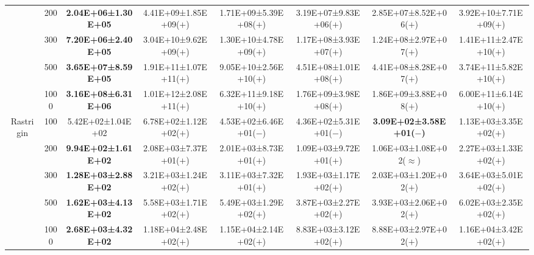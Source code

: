 \begin{tabular}{|cc|c|c|c|c|c|c|}
\multicolumn{1}{|c|}{}                            & 200       & \textbf{2.04E+06±1.30E+05} & 4.41E+09±1.85E+09($+$) & 1.71E+09±5.39E+08($+$)       & 3.19E+07±9.83E+06($+$)       & 2.85E+07±8.52E+06($+$)                & 3.92E+10±7.71E+09($+$) \\ \cline{2-8} 
\multicolumn{1}{|c|}{}                            & 300       & \textbf{7.20E+06±2.40E+05} & 3.04E+10±9.62E+09($+$) & 1.30E+10±4.78E+09($+$)       & 1.17E+08±3.93E+07($+$)       & 1.24E+08±2.97E+07($+$)                & 1.41E+11±2.47E+10($+$) \\ \cline{2-8} 
\multicolumn{1}{|c|}{}                            & 500       & \textbf{3.65E+07±8.59E+05} & 1.91E+11±1.07E+11($+$) & 9.05E+10±2.56E+10($+$)       & 4.51E+08±1.01E+08($+$)       & 4.41E+08±8.28E+07($+$)                & 3.74E+11±5.82E+10($+$) \\ \cline{2-8} 
\multicolumn{1}{|c|}{}                            & 1000      & \textbf{3.16E+08±6.31E+06} & 1.01E+12±2.08E+11($+$) & 6.32E+11±9.18E+10($+$)       & 1.76E+09±3.98E+08($+$)       & 1.86E+09±3.88E+08($+$)                & 6.00E+11±6.14E+10($+$) \\ \hline
\multicolumn{1}{|c|}{\multirow{5}{*}{Rastrigin}}  & 100       & 5.42E+02±1.04E+02          & 6.78E+02±1.12E+02($+$) & 4.53E+02±6.46E+01($-$)       & 4.36E+02±5.31E+01($-$)       & \textbf{3.09E+02±3.58E+01($-$)}       & 1.13E+03±3.35E+02($+$) \\ \cline{2-8} 
\multicolumn{1}{|c|}{}                            & 200       & \textbf{9.94E+02±1.61E+02} & 2.08E+03±7.37E+01($+$) & 2.01E+03±8.73E+01($+$)       & 1.09E+03±9.72E+01($+$)       & 1.06E+03±1.08E+02($\approx$)          & 2.27E+03±1.33E+02($+$) \\ \cline{2-8} 
\multicolumn{1}{|c|}{}                            & 300       & \textbf{1.28E+03±2.88E+02} & 3.21E+03±1.24E+02($+$) & 3.11E+03±7.32E+01($+$)       & 1.93E+03±1.17E+02($+$)       & 2.03E+03±1.20E+02($+$)                & 3.64E+03±5.01E+02($+$) \\ \cline{2-8} 
\multicolumn{1}{|c|}{}                            & 500       & \textbf{1.62E+03±4.13E+02} & 5.58E+03±1.71E+02($+$) & 5.49E+03±1.29E+02($+$)       & 3.87E+03±2.27E+02($+$)       & 3.93E+03±2.06E+02($+$)                & 6.02E+03±2.35E+02($+$) \\ \cline{2-8} 
\multicolumn{1}{|c|}{}                            & 1000      & \textbf{2.68E+03±4.32E+02} & 1.18E+04±2.48E+02($+$) & 1.15E+04±2.14E+02($+$)       & 8.83E+03±3.12E+02($+$)       & 8.88E+03±2.97E+02($+$)                & 1.16E+04±3.42E+02($+$) \\ \hline

\end{tabular}
